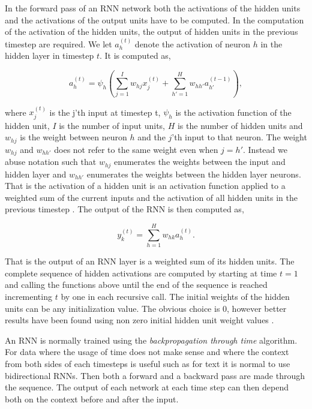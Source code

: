 \begin{description}
        In the forward pass of an \gls{RNN} network both the activations of
        the hidden units and the activations of the output units have to be
        computed. In the computation of the activation of the hidden units, the
        output of hidden units in the previous timestep are required. We let
        $a^{(t)}_h$ denote the activation of neuron $h$ in the hidden layer in
        timestep $t$. It is computed as,

        \begin{equation}
            a^{(t)}_h = \psi_h\left(
                \sum_{j=1}^I w_{hj} x^{(t)}_j +
                \sum_{h'=1}^H w_{hh'} a^{(t-1)}_{h'}
            \right),
        \end{equation}

        where $x_j^{(t)}$ is the j'th input at timestep t, $\psi_h$ is
        the activation function of the hidden unit, $I$ is the number of input
        units, $H$ is the number of hidden units and $w_{hj}$ is the weight
        between neuron $h$ and the $j$'th input to that neuron. The weight
        $w_{hj}$ and $w_{hh'}$ does not refer to the same weight even when $j =
        h'$. Instead we abuse notation such that $w_{hj}$ enumerates the weights
        between the input and hidden layer and $w_{hh'}$ enumerates the weights
        between the hidden layer neurons. That is the activation of a hidden
        unit is an activation function applied to a weighted sum of the current
        inputs and the activation of all hidden units in the previous timestep
        \citep{DBLP:series/sci/2012-385}. The output of the \gls{RNN} is then
        computed as,

        \begin{equation}
            y^{(t)}_k = \sum_{h=1}^H w_{hk} a_{h}^{(t)}.
        \end{equation}

        That is the output of an \gls{RNN} layer is a weighted sum of its
        hidden units. The complete sequence of hidden activations are computed
        by starting at time $t=1$ and calling the functions above until
        the end of the sequence is reached incrementing $t$ by one in each
        recursive call. The initial weights of the hidden units can be any
        initialization value. The obvious choice is 0, however better results
        have been found using non zero initial hidden unit weight values
        \citep{DBLP:series/sci/2012-385}.

        An \gls{RNN} is normally trained using the \emph{backpropagation through
        time} algorithm. For data where the usage of time does not make sense
        and where the context from both sides of each timesteps is useful such
        as for text it is normal to use bidirectional \glspl{RNN}. Then both a
        forward and a backward pass are made through the sequence. The output
        of each network at each time step can then depend both on the context
        before and after the input.


\end{description}
